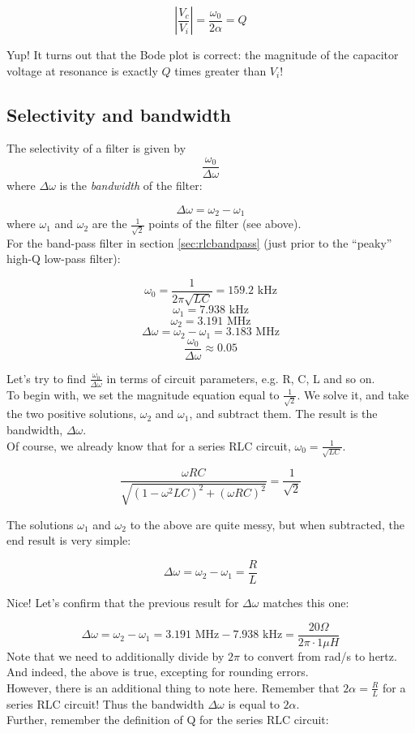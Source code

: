 \documentclass[12pt,a4paper]{report}
\begin{document}
\[ \left| \frac{V_c}{V_i} \right| = \frac{\omega_0}{2\alpha} = Q \]

Yup! It turns out that the Bode plot is correct: the magnitude of the capacitor voltage at resonance is exactly $Q$ times greater than $V_i$!


\subsection{Selectivity and bandwidth}
The selectivity of a filter is given by 
\[ \frac{\omega_0}{\Delta \omega} \]
where $\Delta \omega$ is the \emph{bandwidth} of the filter:

\[ \Delta \omega = \omega_2 - \omega_1 \]
where $\omega_1$ and $\omega_2$ are the $\displaystyle \frac{1}{\sqrt{2}}$ points of the filter (see above).\\
For the band-pass filter in section \ref{sec:rlcbandpass} (just prior to the ``peaky'' high-Q low-pass filter):

\[ \omega_0 = \frac{1}{2\pi \sqrt{LC}} = 159.2 \text{ kHz} \]
\[ \omega_1 = 7.938 \text{ kHz} \]
\[ \omega_2 = 3.191 \text { MHz} \]
\[ \Delta \omega = \omega_2 - \omega_1 = 3.183 \text{ MHz} \]
\[ \frac{\omega_0}{\Delta \omega} \approx 0.05 \]

Let's try to find $\displaystyle \frac{\omega_0}{\Delta \omega}$ in terms of circuit parameters, e.g. R, C, L and so on.\\
To begin with, we set the magnitude equation equal to $\displaystyle \frac{1}{\sqrt{2}}$. We solve it, and take the two positive solutions, $\omega_2$ and $\omega_1$, and subtract them. The result is the bandwidth, $\Delta \omega$.\\
Of course, we already know that for a series RLC circuit, $\displaystyle \omega_0 = \frac{1}{\sqrt{LC}}$.

\[ \frac{\omega RC}{\sqrt{(1 - \omega^2 LC)^2 + (\omega RC)^2}} = \frac{1}{\sqrt{2}} \]

The solutions $\omega_1$ and $\omega_2$ to the above are quite messy, but when subtracted, the end result is very simple:

\[ \Delta \omega = \omega_2 - \omega_1 = \frac{R}{L} \]

Nice! Let's confirm that the previous result for $\Delta \omega$ matches this one:

\[ \Delta \omega = \omega_2 - \omega_1 = 3.191 \text{ MHz} - 7.938 \text{ kHz} = \frac{20 \Omega}{2\pi \cdot 1 \mu H} \]
Note that we need to additionally divide by $2 \pi$ to convert from rad/s to hertz. And indeed, the above is true, excepting for rounding errors.\\
However, there is an additional thing to note here. Remember that $\displaystyle 2 \alpha = \frac{R}{L}$ for a series RLC circuit! Thus the bandwidth $\Delta \omega$ is equal to $2 \alpha$.\\
Further, remember the definition of Q for the series RLC circuit:
\end{document}
